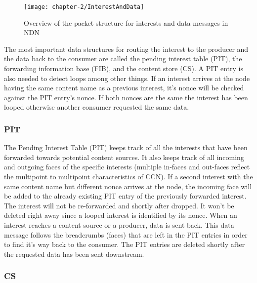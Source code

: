 \vspace{5mm} %

\begin{figure}[H]
  \centering
  \texttt{[image: chapter-2/InterestAndData]}
  \caption{Overview of the packet structure for interests and data messages in NDN}
  \label{fig:InterestAndData}
\end{figure}

\vspace{5mm} %

The most important data structures for routing the interest to the producer and the data back to the consumer are called the pending interest table (PIT), the forwarding information base (FIB), and the content store (CS). A PIT entry is also needed to detect loops among other things. If an interest arrives at the node having the same content name as a previous interest, it's nonce will be checked against the PIT entry's nonce. If both nonces are the same the interest has been looped otherwise another consumer requested the same data.

\subsubsection{PIT}

The Pending Interest Table (PIT) keeps track of all the interests that have been forwarded towards potential content sources. It also keeps track of all incoming and outgoing faces of the specific interests (multiple in-faces and out-faces reflect the multipoint to multipoint characteristics of CCN). If a second interest with the same content name but different nonce arrives at the node, the incoming face will be added to the already existing PIT entry of the previously forwarded interest. The interest will not be re-forwarded and shortly after dropped. It won't be deleted right away since a looped interest is identified by its nonce. When an interest reaches a content source or a producer, data is sent back.  This data message follows the breadcrumbs (faces) that are left in the PIT entries in order to find it's way back to the consumer. The PIT entries are deleted shortly after the requested data has been sent downstream.

\subsubsection{CS} 

